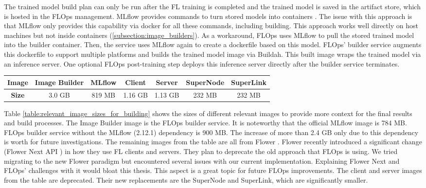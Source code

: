 The trained model build plan can only be run after the FL training is completed and the trained model is saved in the artifact store, which is hosted in the FLOps management.
MLflow provides commands to turn stored models into containers \cite{docs:mlfow_docker_cmds}.
The issue with this approach is that MLflow only provides this capability via docker for all these commands, including building.
This approach works well directly on host machines but not inside containers (\ref{subsection:image_builders}).
As a workaround, FLOps uses MLflow to pull the stored trained model into the builder container.
Then, the service uses MLflow again to create a dockerfile based on this model.
FLOps' builder service augments this dockerfile to support multiple platforms and builds the trained model image via Buildah.
This built image wraps the trained model via an inference server.
One optional FLOps post-training step deploys this inference server directly after the builder service terminates.

\begin{changemargin}{0cm}{0cm}
    \centering
    \begin{tabular}{|c||c|c|c|c|c|c|}
        \hline
            \textbf{Image} & Image Builder & MLflow & Client & Server & SuperNode & SuperLink \\
        \hline
            \textbf{Size} & 3.0 GB & 819 MB & 1.16 GB & 1.13 GB & 232 MB & 232 MB
        \\
        \hline
    \end{tabular}
    \label{table:relevant_image_sizes_for_building}
\end{changemargin}
Table \ref{table:relevant_image_sizes_for_building} shows the sizes of different relevant images to provide more context for the final results and build processes.
The Image Builder image is the FLOps builder service.
It is noteworthy that the official MLflow image is 784 MB.
FLOps builder service without the MLflow (2.12.1) dependency is 900 MB.
The increase of more than 2.4 GB only due to this dependency is worth for future investigations.
The remaining images from the table are all from Flower \cite{flower_images}.
Flower recently introduced a significant change (Flower Next API \cite{docs:flower_next}) in how they use FL clients and servers.
They plan to deprecate the old approach that FLOps is using.
We tried migrating to the new Flower paradigm but encountered several issues with our current implementation.
Explaining Flower Next and FLOps' challenges with it would bloat this thesis.
This aspect is a great topic for future FLOps improvements.
The client and server images from the table are deprecated.
Their new replacements are the SuperNode and SuperLink, which are significantly smaller.

